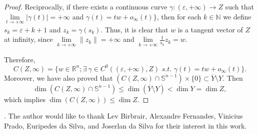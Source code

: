 \documentclass[a4paper,11pt]{amsart}
\newcommand{\R}{\mathbb R}
\newcommand{\N}{\mathbb N}
\begin{document}
\begin{proof}
\bigskip

Reciprocally, if there exists a continuous curve $\gamma:(\varepsilon,+\infty )\to Z$ such that $\lim\limits _{t\to +\infty }|\gamma(t)|=+\infty$ and $\gamma(t)=tw+o_{\infty }(t)\}$, then for each $k\in \N$ we define $s_k=\varepsilon+k+1$ and $z_k=\gamma(s_k)$. Thus, it is clear that $w$ is a tangent vector of $Z$ at infinity, since $\lim\limits _{k\to +\infty }\|z_k\|=+\infty $ and $\lim\limits _{k\to +\infty }\frac{1}{s_k}z_k=w$.


Therefore, 
$$
C(Z,\infty)=\{w\in \R^n; \exists\ \gamma\in C^0((\varepsilon ,+\infty ), Z) \,\,  s.t.\,\,\gamma(t)=tw+o_{\infty }(t)\}.
$$ 
Moreover, we have also proved that $(C(Z,\infty)\cap \mathbb{S}^{n-1})\times \{0\}\subset \overline{Y}\setminus Y$. Then 
$$
\dim(C(Z,\infty)\cap \mathbb{S}^{n-1})\leq \dim(\overline{Y}\setminus Y)<\dim Y=\dim Z,
$$
which implies $\dim(C(Z,\infty))\leq \dim Z$.
\end{proof}



. 
The author would like to thank Lev Birbrair, Alexandre Fernandes, Vinicius Prado, Euripedes da Silva, and Joserlan da Silva for their interest in this work.
\end{document}
